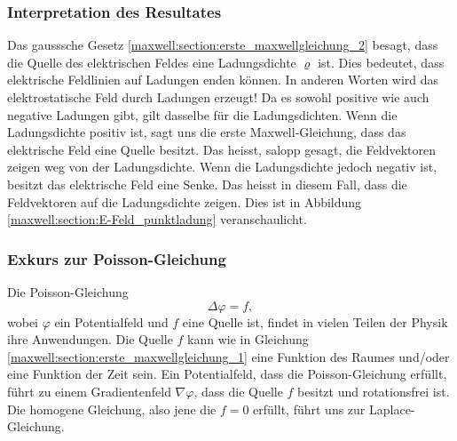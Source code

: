 \subsubsection{Interpretation des Resultates}
Das gausssche Gesetz \eqref{maxwell:section:erste_maxwellgleichung_2} besagt, dass die Quelle des elektrischen Feldes eine Ladungsdichte $\varrho$ ist.
Dies bedeutet, dass elektrische Feldlinien auf Ladungen enden können.
In anderen Worten wird das elektrostatische Feld durch Ladungen erzeugt!
Da es sowohl positive wie auch negative Ladungen gibt, gilt dasselbe für die Ladungsdichten.
Wenn die Ladungsdichte positiv ist, sagt uns die erste Maxwell-Gleichung, dass das elektrische Feld eine Quelle besitzt.
Das heisst, salopp gesagt, die Feldvektoren zeigen weg von der Ladungsdichte.
Wenn die Ladungsdichte jedoch negativ ist, besitzt das elektrische Feld eine Senke.
Das heisst in diesem Fall, dass die Feldvektoren auf die Ladungsdichte zeigen. Dies ist in Abbildung \ref{maxwell:section:E-Feld_punktladung} veranschaulicht.

\subsubsection{Exkurs zur Poisson-Gleichung}
Die Poisson-Gleichung
\[
\Delta\varphi
=
f,
\]
wobei $\varphi$ ein Potentialfeld und $f$ eine Quelle ist, findet in vielen Teilen der Physik ihre Anwendungen.
Die Quelle $f$ kann wie in Gleichung \eqref{maxwell:section:erste_maxwellgleichung_1} eine Funktion des Raumes und/oder eine Funktion der Zeit sein.
Ein Potentialfeld, dass die Poisson-Gleichung erfüllt, führt zu einem Gradientenfeld $\nabla\varphi$, dass die Quelle $f$ besitzt und rotationsfrei ist.
Die homogene Gleichung, also jene die $f = 0$ erfüllt, führt uns zur Laplace-Gleichung.







